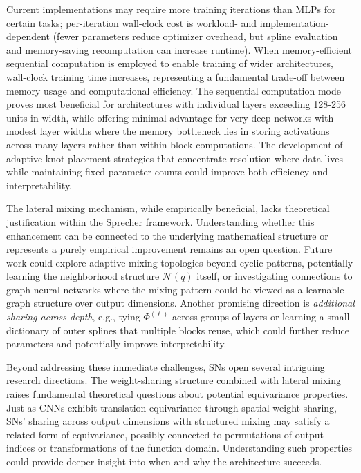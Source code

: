 \documentclass{article}
\theoremstyle{plain}
\theoremstyle{definition}
\theoremstyle{remark}
\begin{document}
Current implementations may require more training iterations than MLPs for certain tasks; per-iteration wall-clock cost is workload- and implementation-dependent (fewer parameters reduce optimizer overhead, but spline evaluation and memory-saving recomputation can increase runtime). When memory-efficient sequential computation is employed to enable training of wider architectures, wall-clock training time increases, representing a fundamental trade-off between memory usage and computational efficiency. The sequential computation mode proves most beneficial for architectures with individual layers exceeding 128-256 units in width, while offering minimal advantage for very deep networks with modest layer widths where the memory bottleneck lies in storing activations across many layers rather than within-block computations. The development of adaptive knot placement strategies that concentrate resolution where data lives while maintaining fixed parameter counts could improve both efficiency and interpretability.

The lateral mixing mechanism, while empirically beneficial, lacks theoretical justification within the Sprecher framework. Understanding whether this enhancement can be connected to the underlying mathematical structure or represents a purely empirical improvement remains an open question. Future work could explore adaptive mixing topologies beyond cyclic patterns, potentially learning the neighborhood structure $\mathcal{N}(q)$ itself, or investigating connections to graph neural networks where the mixing pattern could be viewed as a learnable graph structure over output dimensions. Another promising direction is \emph{additional sharing across depth}, e.g., tying $\Phi^{(\ell)}$ across groups of layers or learning a small dictionary of outer splines that multiple blocks reuse, which could further reduce parameters and potentially improve interpretability.

Beyond addressing these immediate challenges, SNs open several intriguing research directions. The weight-sharing structure combined with lateral mixing raises fundamental theoretical questions about potential equivariance properties. Just as CNNs exhibit translation equivariance through spatial weight sharing, SNs' sharing across output dimensions with structured mixing may satisfy a related form of equivariance, possibly connected to permutations of output indices or transformations of the function domain. Understanding such properties could provide deeper insight into when and why the architecture succeeds.
\end{document}
